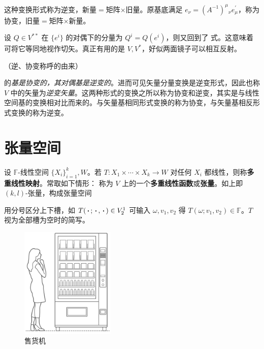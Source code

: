 这种变换形式称为逆变，新量$=$矩阵$\times$旧量。原基底满足 $e_\nu={(A^{-1})}^\mu{}_\nu e^\prime_\mu$，称为协变，旧量$=$矩阵$\times$新量。

设 $Q\in V^{**}$ 在 $\{e^i\}$ 的对偶下的分量为 $Q^i=Q(e^i)$，则又回到了 式。这意味着可将它等同地视作切矢。真正有用的是 $V,V^*$，好似两面镜子可以相互反射。
 

（逆、协变称呼的由来）

的\textit{基是协变的，其对偶基是逆变的}。进而可见矢量分量变换是逆变形式，因此也称 $V$ 中的矢量为\textit{逆变矢量}。这两种形式的变换之所以称为协变和逆变，其实是与线性空间基的变换相对比而来的。与矢量基相同形式变换的称为协变，与矢量基相反形式变换的称为逆变。

\section{张量空间}

\begin{definition}
    设 $\mathbb F$-线性空间 $\{X_i\}_{i=1}^k,W$。若
    $T:X_1\times\cdots\times X_k\to W$
    对任何 $X_i$ 都线性，则称\textbf{多重线性映射}。常取如下情形：
    称为 $V$ 上的一个\textbf{多重线性函数}或\textbf{张量}。如上即 $(k,l)$-张量，构成张量空间
\end{definition}
\begin{remark}
    用分号区分上下槽，如 $T(\oo;\oo,\oo)\in V^1_2$ 可输入 $\omega,v_1,v_2$ 得 $T(\omega;v_1,v_2)\in\mathbb F$。$T$ 视为全部槽为空时的简写。
\end{remark}

\begin{figure}[ht]
    \centering
    \includegraphics[width=0.4\textwidth]{fig/appx/vending.jpg}
    \caption{售货机}
    \label{fig:vending}
\end{figure}

